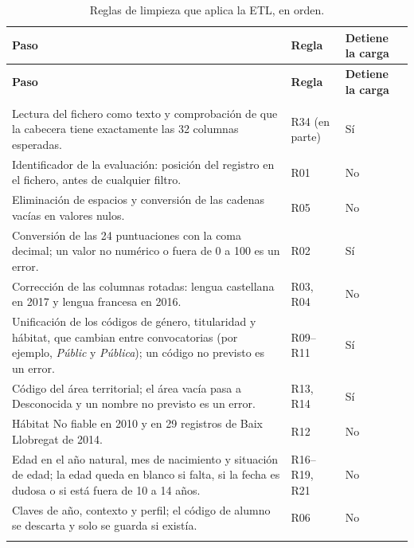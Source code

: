 \documentclass[12pt, a4paper, oneside]{report}
\begin{document}
{\small{}\renewcommand{\arraystretch}{1.1}
\begin{longtable}{@{} p{10.2cm} >{\raggedright\arraybackslash}p{2.1cm} >{\raggedright\arraybackslash}p{2.0cm} @{}}
\toprule
\textbf{Paso} & \textbf{Regla} & \textbf{Detiene la carga} \\ \midrule
\endfirsthead
\toprule
\textbf{Paso} & \textbf{Regla} & \textbf{Detiene la carga} \\ \midrule
\endhead
\bottomrule
\caption{Reglas de limpieza que aplica la ETL, en orden.}\label{tab:reglas_etl}
\endlastfoot
\multicolumn{3}{@{}l}{\textit{Tabla intermedia (\texttt{stg\_Evaluaciones})}} \\
Lectura del fichero como texto y comprobación de que la cabecera tiene exactamente las 32 columnas esperadas. & R34 (en parte) & Sí \\ \addlinespace
Identificador de la evaluación: posición del registro en el fichero, antes de cualquier filtro. & R01 & No \\ \addlinespace
Eliminación de espacios y conversión de las cadenas vacías en valores nulos. & R05 & No \\ \addlinespace
Conversión de las 24 puntuaciones con la coma decimal; un valor no numérico o fuera de 0 a 100 es un error. & R02 & Sí \\ \addlinespace
Corrección de las columnas rotadas: lengua castellana en 2017 y lengua francesa en 2016. & R03, R04 & No \\ \addlinespace
Unificación de los códigos de género, titularidad y hábitat, que cambian entre convocatorias (por ejemplo, \textit{Públic} y \textit{Pública}); un código no previsto es un error. & R09--R11 & Sí \\ \addlinespace
Código del área territorial; el área vacía pasa a \guillemotleft{}Desconocida\guillemotright{} y un nombre no previsto es un error. & R13, R14 & Sí \\ \addlinespace
Hábitat \guillemotleft{}No fiable\guillemotright{} en 2010 y en 29 registros de Baix Llobregat de 2014. & R12 & No \\ \addlinespace
Edad en el año natural, mes de nacimiento y situación de edad; la edad queda en blanco si falta, si la fecha es dudosa o si está fuera de 10 a 14 años. & R16--R19, R21 & No \\ \addlinespace
Claves de año, contexto y perfil; el código de alumno se descarta y solo se guarda si existía. & R06 & No \\ \addlinespace
\multicolumn{3}{@{}l}{\textit{Tabla de hechos \texttt{FactPuntuacion}}} \\

\end{longtable}}
\end{document}

